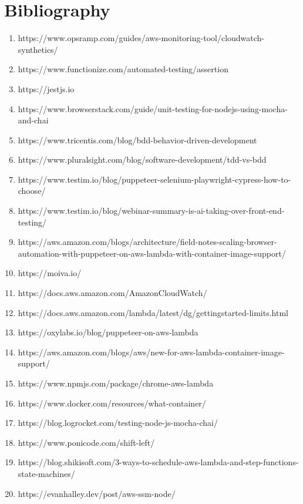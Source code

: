 \documentclass[12pt,a4paper,titlepage]{report}
\begin{document}
\printbibliography[title={References}]

\chapter{Bibliography}
\begin{enumerate}
\item https://www.opsramp.com/guides/aws-monitoring-tool/cloudwatch-synthetics/
\item https://www.functionize.com/automated-testing/assertion
\item https://jestjs.io
\item https://www.browserstack.com/guide/unit-testing-for-nodejs-using-mocha-and-chai
\item https://www.tricentis.com/blog/bdd-behavior-driven-development
\item https://www.pluralsight.com/blog/software-development/tdd-vs-bdd
\item https://www.testim.io/blog/puppeteer-selenium-playwright-cypress-how-to-choose/
\item https://www.testim.io/blog/webinar-summary-is-ai-taking-over-front-end-testing/
\item https://aws.amazon.com/blogs/architecture/field-notes-scaling-browser-automation-with-puppeteer-on-aws-lambda-with-container-image-support/
\item https://moiva.io/
\item https://docs.aws.amazon.com/AmazonCloudWatch/
\item https://docs.aws.amazon.com/lambda/latest/dg/gettingstarted-limits.html
\item https://oxylabs.io/blog/puppeteer-on-aws-lambda
\item https://aws.amazon.com/blogs/aws/new-for-aws-lambda-container-image-support/
\item https://www.npmjs.com/package/chrome-aws-lambda
\item https://www.docker.com/resources/what-container/
\item https://blog.logrocket.com/testing-node-js-mocha-chai/
\item https://www.ponicode.com/shift-left/
\item https://blog.shikisoft.com/3-ways-to-schedule-aws-lambda-and-step-functions-state-machines/
\item https://evanhalley.dev/post/aws-ssm-node/
\end{enumerate}
\end{document}
